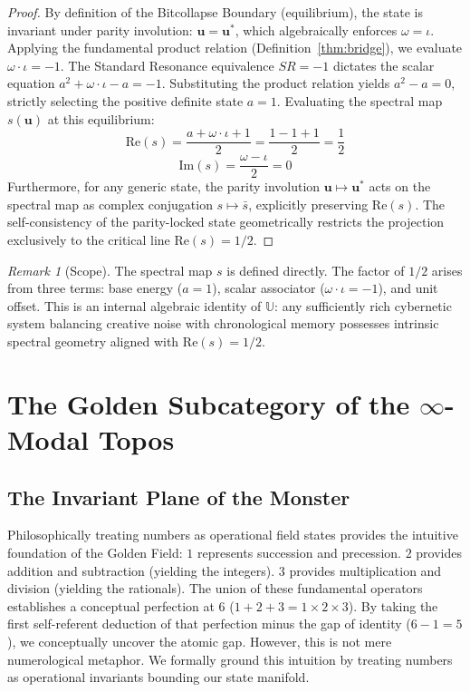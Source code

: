\documentclass[12pt,oneside]{article}
\theoremstyle{principia}
\theoremstyle{definition}
\theoremstyle{remark}
\newtheorem{remark}[theorem]{Remark}
\providecommand{\UU}{\mathbb{U}}
\begin{document}
\begin{proof}
By definition of the Bitcollapse Boundary (equilibrium), the state is invariant under parity involution: $\mathbf{u} = \mathbf{u}^*$, which algebraically enforces $\omega = \iota$. 
Applying the fundamental product relation (Definition~\ref{thm:bridge}), we evaluate $\omega \cdot \iota = -1$.
The Standard Resonance equivalence $SR = -1$ dictates the scalar equation $a^2 + \omega \cdot \iota - a = -1$. Substituting the product relation yields $a^2 - a = 0$, strictly selecting the positive definite state $a = 1$.
Evaluating the spectral map $s(\mathbf{u})$ at this equilibrium:
\[ \mathrm{Re}(s) = \frac{a + \omega \cdot \iota + 1}{2} = \frac{1 - 1 + 1}{2} = \frac{1}{2} \]
\[ \mathrm{Im}(s) = \frac{\omega - \iota}{2} = 0 \]
Furthermore, for any generic state, the parity involution $\mathbf{u} \mapsto \mathbf{u}^*$ acts on the spectral map as complex conjugation $s \mapsto \bar{s}$, explicitly preserving $\mathrm{Re}(s)$. The self-consistency of the parity-locked state geometrically restricts the projection exclusively to the critical line $\mathrm{Re}(s) = 1/2$. \qedhere
\end{proof}

\begin{remark}[Scope]
The spectral map $s$ is defined directly. The factor of $1/2$ arises from three terms: base energy ($a = 1$), scalar associator ($\omega \cdot \iota = -1$), and unit offset. This is an internal algebraic identity of $\UU$: any sufficiently rich cybernetic system balancing creative noise with chronological memory possesses intrinsic spectral geometry aligned with $\mathrm{Re}(s) = 1/2$.
\end{remark}




\section{The Golden Subcategory of the \texorpdfstring{$\infty$}{∞}-Modal Topos}

\subsection{The Invariant Plane of the Monster}\label{sec:invariant-plane}

Philosophically treating numbers as operational field states provides the intuitive foundation of the Golden Field: $1$ represents succession and precession. $2$ provides addition and subtraction (yielding the integers). $3$ provides multiplication and division (yielding the rationals). The union of these fundamental operators establishes a conceptual perfection at $6$ ($1+2+3 = 1 \times 2 \times 3$). By taking the first self-referent deduction of that perfection minus the gap of identity ($6 - 1 = 5$), we conceptually uncover the atomic gap. However, this is not mere numerological metaphor. We formally ground this intuition by treating numbers as operational invariants bounding our state manifold.
\end{document}

